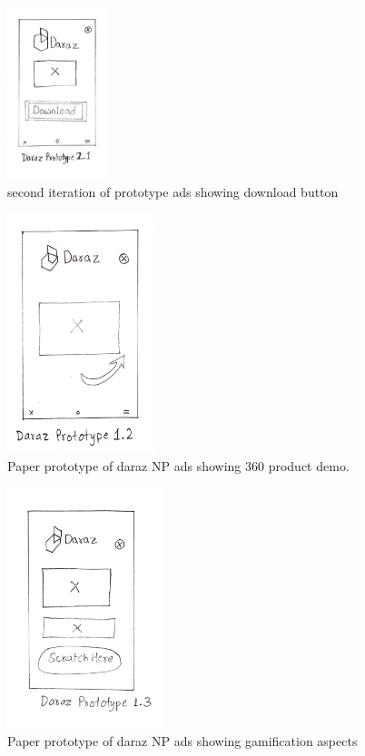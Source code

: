 \documentclass[journal]{IEEEtran}
\begin{document}
\begin{figure}[H]
    \centering
    \includegraphics[height=5cm]{dp4.jpg}
    \caption{second iteration of prototype ads showing download button}
\end{figure}

\begin{figure}[H]
    \centering
    \includegraphics[height=7cm]{dp2.jpg}
    \caption{Paper prototype of daraz NP ads showing 360\textdegree{} product demo.}
\end{figure}

\begin{figure}[H]
    \centering
    \includegraphics[height=7cm]{dp3.jpg}
    \caption{Paper prototype of daraz NP ads showing gamification aspects}
\end{figure}
\end{document}
